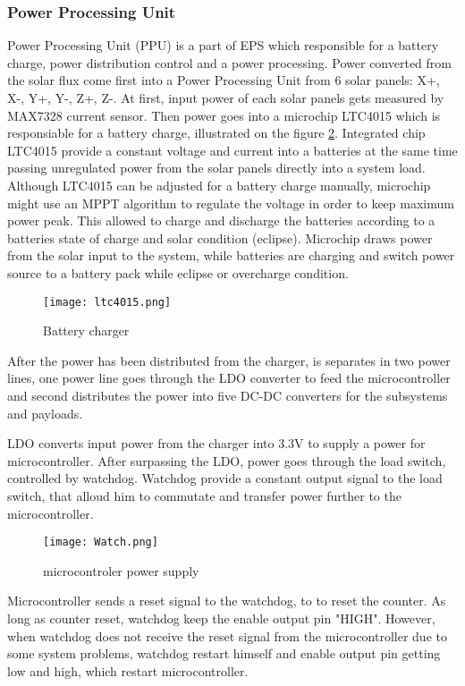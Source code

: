    \subsubsection{Power Processing Unit}
   Power Processing Unit (PPU) is a part of EPS which responsible for a battery charge, power distribution control and a power processing. 
   Power converted from the solar flux come first into a Power Processing Unit from 6 solar panels: X+, X-, Y+, Y-, Z+, Z-. At first, input power of each solar panels gets measured by MAX7328 current sensor. Then power goes into a microchip LTC4015 which is responsiable for a battery charge, illustrated on the figure \ref{fig: ltc4015}. Integrated chip LTC4015 provide a constant voltage and current into a batteries at the same time passing unregulated power from the solar panels directly into a system load. Although LTC4015 can be adjusted for a battery charge manually, microchip might use an MPPT algorithm to regulate the voltage in order to keep maximum power peak. This allowed to charge and discharge the batteries according to a batteries state of charge and solar condition (eclipse). Microchip draws power from the solar input to the system, while batteries are charging and switch power source to a battery pack while eclipse or overcharge condition.
   
  \begin{figure}[h]
  	\centering
  	\texttt{[image: ltc4015.png]}
  	\caption{Battery charger}
  	\label{fig: ltc4015}
  \end{figure}
  
 After the power has been distributed from the charger, is separates in two power lines, one power line goes through the LDO converter to feed the microcontroller and second distributes the power into five DC-DC converters for the subsystems and payloads.
 
 LDO converts input power from the charger into 3.3V to supply a power for microcontroller. After surpassing the LDO, power goes through the load switch, controlled by watchdog. Watchdog provide a constant output signal to the load switch, that alloud him to commutate and transfer power further to the microcontroller. 
  
    \begin{figure}[h]
    	\centering
    	\texttt{[image: Watch.png]}
    	\caption{microcontroler power supply}
    	\label{fig: ltc4015}
    \end{figure}
  Microcontroller sends a reset signal to the watchdog, to to reset the counter. As long as counter reset, watchdog keep the enable output pin "HIGH". However, when watchdog does not receive the reset signal from the microcontroller due to some system problems, watchdog restart himself and enable output pin getting low and high, which restart microcontroller.
  
